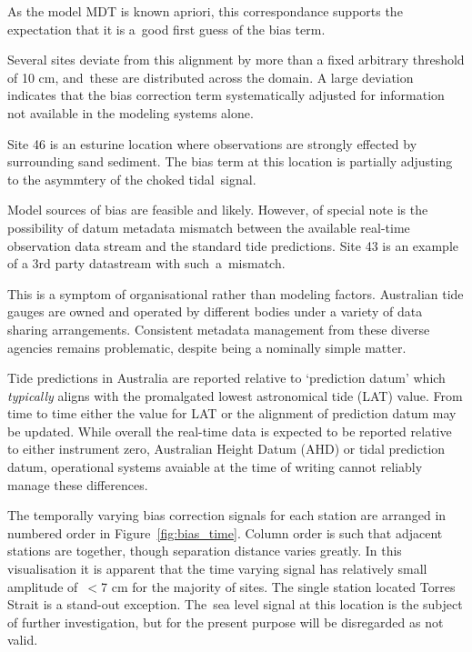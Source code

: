 As the model MDT is known apriori, this correspondance supports the expectation that it is a~good first guess of the bias term.

Several sites deviate from this alignment by more than a fixed arbitrary threshold of 10 cm, and~these are distributed across the domain.
A large deviation indicates that the bias correction term systematically adjusted for information not available in the modeling systems alone.  


Site 46 is an esturine location where observations are strongly effected by surrounding sand sediment. The bias term at this location is partially adjusting to the asymmtery of the choked tidal~signal. 


Model sources of bias are feasible and likely.
However, of special note is the possibility of datum metadata mismatch between the available real-time observation data stream and the standard tide predictions. 
Site 43 is an example of a 3rd party datastream with such~a~mismatch. 

This is a symptom of organisational rather than modeling factors.   
Australian tide gauges are owned and operated by different bodies under a variety of data sharing arrangements.
Consistent metadata management from these diverse agencies remains problematic, despite being a nominally simple matter.

Tide predictions in Australia are reported relative to `prediction datum' which \textit{typically} aligns with the promalgated lowest astronomical tide (LAT) value.   
From time to time either the value for LAT or the alignment of prediction datum may be updated.  
While overall the real-time data is expected to be reported relative to either instrument zero, Australian Height Datum (AHD) or tidal prediction datum, operational systems avaiable at the time of writing cannot reliably manage these differences.


The temporally varying bias correction signals for each station are arranged in numbered order in Figure~\ref{fig:bias_time}.
Column order is such that adjacent stations are together, though separation distance varies greatly. 
In this visualisation it is apparent that the time varying signal has relatively small amplitude of~$<$7 cm for the majority of sites.
The single station located Torres Strait is a stand-out exception.  The~sea level signal at this location is the subject of further investigation, but for the present purpose will be disregarded as not valid.  


